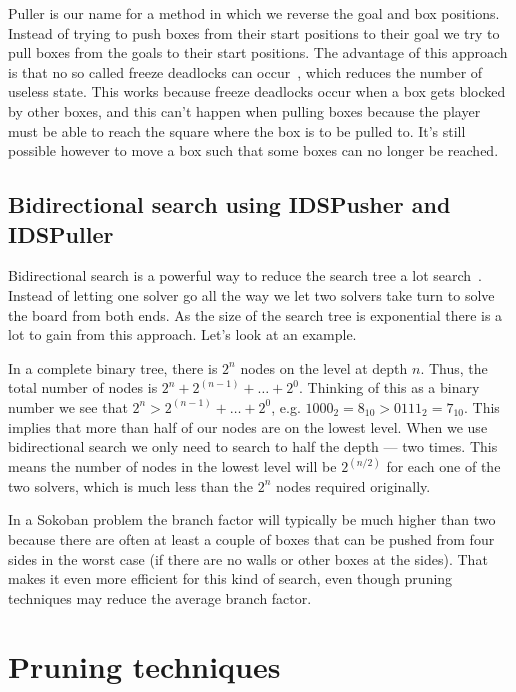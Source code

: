 \documentclass[a4paper,11pt]{article}
\renewcommand{\*}[0]{\cdot}
\begin{document}
Puller is our name for a method in which we reverse the goal and box positions.
Instead of trying to push boxes from their start positions to their goal we try
to pull boxes from the goals to their start positions. The advantage of this
approach is that no so called freeze deadlocks can occur~\cite{takes2007},
which reduces the number of useless state. This works because freeze deadlocks
occur when a box gets blocked by other boxes, and this can't happen when
pulling boxes because the player must be able to reach the square where the box
is to be pulled to.  It's still possible however to move a box such that some
boxes can no longer be reached.


\subsection{Bidirectional search using IDSPusher and IDSPuller}

Bidirectional search is a powerful way to reduce the search tree a lot
search~\cite{russell2009}. Instead of letting one solver go all the way we let
two solvers take turn to solve the board from both ends. As the size of the
search tree is exponential there is a lot to gain from this approach. Let's
look at an example.

In a complete binary tree, there is $2^n$ nodes on the level at depth $n$. Thus,
the total number of nodes is $2^n + 2^{(n-1)} + \ldots + 2^0$. Thinking of this
as a binary number we see that $2^n > 2^{(n-1)} + \ldots + 2^0$, e.g. $1000_2 =
8_{10} > 0111_2 = 7_{10}$. This implies that more than half of our nodes are on
the lowest level. When we use bidirectional search we only need to search to
half the depth --- two times. This means the number of nodes in the lowest level
will be $2^(n/2)$ for each one of the two solvers, which is much less than the
$2^n$ nodes required originally.

In a Sokoban problem the branch factor will typically be much higher than two
because there are often at least a couple of boxes that can be pushed from four
sides in the worst case (if there are no walls or other boxes at the sides).
That makes it even more efficient for this kind of search, even though pruning
techniques may reduce the average branch factor.



\section{Pruning techniques}
\end{document}

